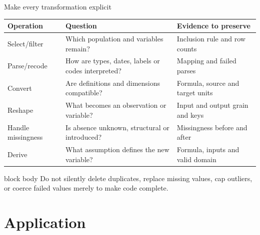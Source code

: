 \documentclass[10pt,aspectratio=169]{beamer}
\begin{document}
\begin{frame}{Make every transformation explicit}

\scriptsize

\begin{tabularx}{\textwidth}{lXX}
\toprule
\textbf{Operation} & \textbf{Question} & \textbf{Evidence to preserve} \\
\midrule
Select/filter & Which population and variables remain? & Inclusion rule and row counts \\
Parse/recode & How are types, dates, labels or codes interpreted? & Mapping and failed parses \\
Convert & Are definitions and dimensions compatible? & Formula, source and target units \\
Reshape & What becomes an observation or variable? & Input and output grain and keys \\
Handle missingness & Is absence unknown, structural or introduced? & Missingness before and after \\
Derive & What assumption defines the new variable? & Formula, inputs and valid domain \\
\bottomrule
\end{tabularx}

\vspace{0.40cm}

\small

\begin{beamercolorbox}[rounded=true,sep=8pt]{block body}
Do not silently delete duplicates, replace missing values, cap outliers, or coerce failed values merely to make code complete.
\end{beamercolorbox}

\end{frame}


\section{Application}
\end{document}
